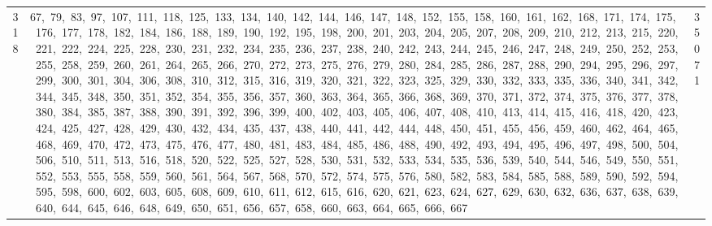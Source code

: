 \begin{longtable}{c|p{}|r}
318 & 67,\ 79,\ 83,\ 97,\ 107,\ 111,\ 118,\ 125,\ 133,\ 134,\ 140,\ 142,\ 144,\ 146,\ 147,\ 148,\ 152,\ 155,\ 158,\ 160,\ 161,\ 162,\ 168,\ 171,\ 174,\ 175,\ 176,\ 177,\ 178,\ 182,\ 184,\ 186,\ 188,\ 189,\ 190,\ 192,\ 195,\ 198,\ 200,\ 201,\ 203,\ 204,\ 205,\ 207,\ 208,\ 209,\ 210,\ 212,\ 213,\ 215,\ 220,\ 221,\ 222,\ 224,\ 225,\ 228,\ 230,\ 231,\ 232,\ 234,\ 235,\ 236,\ 237,\ 238,\ 240,\ 242,\ 243,\ 244,\ 245,\ 246,\ 247,\ 248,\ 249,\ 250,\ 252,\ 253,\ 255,\ 258,\ 259,\ 260,\ 261,\ 264,\ 265,\ 266,\ 270,\ 272,\ 273,\ 275,\ 276,\ 279,\ 280,\ 284,\ 285,\ 286,\ 287,\ 288,\ 290,\ 294,\ 295,\ 296,\ 297,\ 299,\ 300,\ 301,\ 304,\ 306,\ 308,\ 310,\ 312,\ 315,\ 316,\ 319,\ 320,\ 321,\ 322,\ 323,\ 325,\ 329,\ 330,\ 332,\ 333,\ 335,\ 336,\ 340,\ 341,\ 342,\ 344,\ 345,\ 348,\ 350,\ 351,\ 352,\ 354,\ 355,\ 356,\ 357,\ 360,\ 363,\ 364,\ 365,\ 366,\ 368,\ 369,\ 370,\ 371,\ 372,\ 374,\ 375,\ 376,\ 377,\ 378,\ 380,\ 384,\ 385,\ 387,\ 388,\ 390,\ 391,\ 392,\ 396,\ 399,\ 400,\ 402,\ 403,\ 405,\ 406,\ 407,\ 408,\ 410,\ 413,\ 414,\ 415,\ 416,\ 418,\ 420,\ 423,\ 424,\ 425,\ 427,\ 428,\ 429,\ 430,\ 432,\ 434,\ 435,\ 437,\ 438,\ 440,\ 441,\ 442,\ 444,\ 448,\ 450,\ 451,\ 455,\ 456,\ 459,\ 460,\ 462,\ 464,\ 465,\ 468,\ 469,\ 470,\ 472,\ 473,\ 475,\ 476,\ 477,\ 480,\ 481,\ 483,\ 484,\ 485,\ 486,\ 488,\ 490,\ 492,\ 493,\ 494,\ 495,\ 496,\ 497,\ 498,\ 500,\ 504,\ 506,\ 510,\ 511,\ 513,\ 516,\ 518,\ 520,\ 522,\ 525,\ 527,\ 528,\ 530,\ 531,\ 532,\ 533,\ 534,\ 535,\ 536,\ 539,\ 540,\ 544,\ 546,\ 549,\ 550,\ 551,\ 552,\ 553,\ 555,\ 558,\ 559,\ 560,\ 561,\ 564,\ 567,\ 568,\ 570,\ 572,\ 574,\ 575,\ 576,\ 580,\ 582,\ 583,\ 584,\ 585,\ 588,\ 589,\ 590,\ 592,\ 594,\ 595,\ 598,\ 600,\ 602,\ 603,\ 605,\ 608,\ 609,\ 610,\ 611,\ 612,\ 615,\ 616,\ 620,\ 621,\ 623,\ 624,\ 627,\ 629,\ 630,\ 632,\ 636,\ 637,\ 638,\ 639,\ 640,\ 644,\ 645,\ 646,\ 648,\ 649,\ 650,\ 651,\ 656,\ 657,\ 658,\ 660,\ 663,\ 664,\ 665,\ 666,\ 667 & 35071 \\

\end{longtable}
